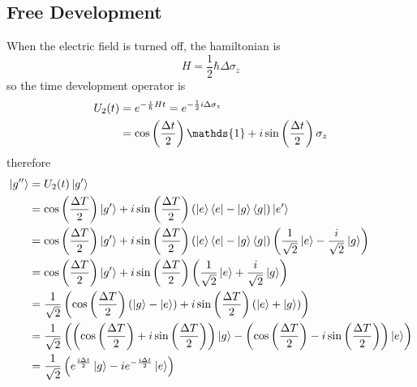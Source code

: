 \subsection{Free Development}
When the electric field is turned off, the hamiltonian is
\begin{equation}
	H=\frac{1}{2}\hbar\Delta\sigma_z
\end{equation}
so the time development operator is
\begin{align}
	U_2(t) &= e^{-\frac{i}{\hbar}Ht}=e^{-\frac{1}{2}i\Delta\sigma_z}\\
	&= \cos\ins{\frac{\Delta t}{2}}\mathds{1}+i\sin\ins{\frac{\Delta t}{2}}\sigma_z
\end{align}
therefore
\begin{align}
	\ket{g''} &= U_2(t)\ket{g'}\\
	&= \cos\left(\frac{\Delta T}{2}\right)\ket{g'}+i\sin\left(\frac{\Delta T}{2}\right)\left(\left\lvert e\right\rangle\left\langle e\right\rvert-\left\lvert g\right\rangle\left\langle g\right\rvert\right)\ket{e'}\\
	&= \cos\left(\frac{\Delta T}{2}\right)\ket{g'}+i\sin\left(\frac{\Delta T}{2}\right)\left(\left\lvert e\right\rangle\left\langle e\right\rvert-\left\lvert g\right\rangle\left\langle g\right\rvert\right)\left(\frac{1}{\sqrt{2}}\ket{e}-\frac{i}{\sqrt{2}}\ket{g}\right)\\
	&= \cos\left(\frac{\Delta T}{2}\right)\ket{g'}+i\sin\left(\frac{\Delta T}{2}\right)\left(\frac{1}{\sqrt{2}}\ket{e}+\frac{i}{\sqrt{2}}\ket{g}\right)\\
	&= \frac{1}{\sqrt{2}}\left(\cos\left(\frac{\Delta T}{2}\right)\left(\ket{g}-\ket{e}\right)+i\sin\left(\frac{\Delta T}{2}\right)\left(\ket{e}+\ket{g}\right)\right)\\
	&= \frac{1}{\sqrt{2}}\left(\left(\cos\left(\frac{\Delta T}{2}\right)+i\sin\left(\frac{\Delta T}{2}\right)\right)\ket{g}-\left(\cos\left(\frac{\Delta T}{2}\right)-i\sin\left(\frac{\Delta T}{2}\right)\right)\ket{e}\right)\\
	&= \frac{1}{\sqrt{2}}\left(e^{\frac{i\Delta t}{2}}\ket{g}-ie^{-\frac{i\Delta t}{2}}\ket{e}\right)
\end{align}

\newpage
